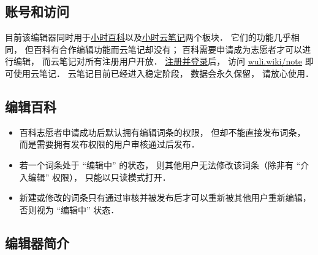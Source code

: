 \subsection{账号和访问}
目前该编辑器同时用于\href{http://wuli.wiki/book/}{小时百科}以及\href{http://wuli.wiki/note/}{小时云笔记}两个板块． 它们的功能几乎相同， 但百科有合作编辑功能而云笔记却没有； 百科需要申请成为志愿者才可以进行编辑， 而云笔记对所有注册用户开放． \href{https://wuli.wiki/authentication/login}{注册并登录}后， 访问 \href{http://wuli.wiki/note/}{wuli.wiki/note} 即可使用云笔记． 云笔记目前已经进入稳定阶段， 数据会永久保留， 请放心使用．

\subsection{编辑百科}
\begin{itemize}
\item 百科志愿者申请成功后默认拥有编辑词条的权限， 但却不能直接发布词条， 而是需要拥有发布权限的用户审核通过后发布．
\item 若一个词条处于 “编辑中” 的状态， 则其他用户无法修改该词条（除非有 “介入编辑” 权限）， 只能以只读模式打开．
\item 新建或修改的词条只有通过审核并被发布后才可以重新被其他用户重新编辑， 否则视为 “编辑中” 状态．
\end{itemize}

\subsection{编辑器简介}

